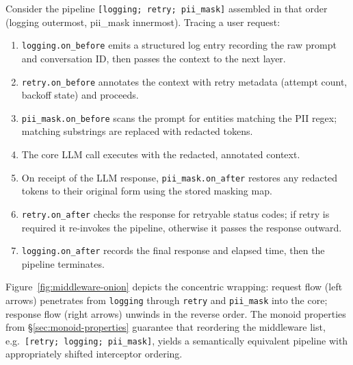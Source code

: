 Consider the pipeline \texttt{[logging; retry; pii\_mask]} assembled in that
order (logging outermost, pii\_mask innermost).  Tracing a user request:

\begin{enumerate}
\item \texttt{logging.on\_before} emits a structured log entry recording the
  raw prompt and conversation ID, then passes the context to the next layer.
\item \texttt{retry.on\_before} annotates the context with retry metadata
  (attempt count, backoff state) and proceeds.
\item \texttt{pii\_mask.on\_before} scans the prompt for entities matching
  the PII regex; matching substrings are replaced with redacted tokens.
\item The core LLM call executes with the redacted, annotated context.
\item On receipt of the LLM response, \texttt{pii\_mask.on\_after} restores
  any redacted tokens to their original form using the stored masking map.
\item \texttt{retry.on\_after} checks the response for retryable status
  codes; if retry is required it re-invokes the pipeline, otherwise it
  passes the response outward.
\item \texttt{logging.on\_after} records the final response and elapsed
  time, then the pipeline terminates.
\end{enumerate}

Figure~\ref{fig:middleware-onion} depicts the concentric wrapping:
request flow (left arrows) penetrates from \texttt{logging} through
\texttt{retry} and \texttt{pii\_mask} into the core; response flow (right
arrows) unwinds in the reverse order.  The monoid properties from
\S\ref{sec:monoid-properties} guarantee that reordering the middleware
list, e.g.\ \texttt{[retry; logging; pii\_mask]}, yields a semantically
equivalent pipeline with appropriately shifted interceptor ordering.